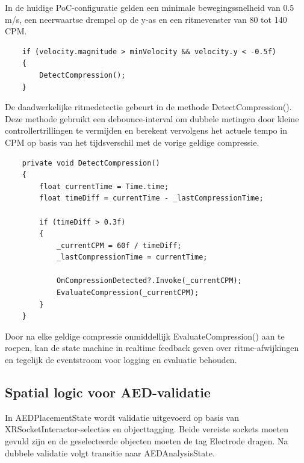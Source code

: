 In de huidige PoC-configuratie gelden een minimale bewegingssnelheid van 0.5 m/s, een neerwaartse drempel op de y-as en een ritmevenster van 80 tot 140 CPM.

\begin{listing}[ht]
    \begin{verbatim}
    if (velocity.magnitude > minVelocity && velocity.y < -0.5f)
    {
        DetectCompression();
    }
    \end{verbatim}
\caption{Kernlogica voor detectie van compressiebewegingen in CPRInteractor.}
\label{listing:cpr_interactor}
\end{listing}

De daadwerkelijke ritmedetectie gebeurt in de methode DetectCompression(). Deze methode gebruikt een debounce-interval om dubbele metingen door kleine controllertrillingen te vermijden en berekent vervolgens het actuele tempo in CPM op basis van het tijdsverschil met de vorige geldige compressie.

\begin{listing}[ht]
    \begin{verbatim}
    private void DetectCompression()
    {
        float currentTime = Time.time;
        float timeDiff = currentTime - _lastCompressionTime;

        if (timeDiff > 0.3f)
        {
            _currentCPM = 60f / timeDiff;
            _lastCompressionTime = currentTime;

            OnCompressionDetected?.Invoke(_currentCPM);
            EvaluateCompression(_currentCPM);
        }
    }
    \end{verbatim}
\caption{Debounce en CPM-berekening in DetectCompression().}
\label{listing:detect_compression}
\end{listing}

Door na elke geldige compressie onmiddellijk EvaluateCompression() aan te roepen, kan de state machine in realtime feedback geven over ritme-afwijkingen en tegelijk de eventstroom voor logging en evaluatie behouden.

\subsection{Spatial logic voor AED-validatie}

In AEDPlacementState wordt validatie uitgevoerd op basis van XRSocketInteractor-selecties en objecttagging. Beide vereiste sockets moeten gevuld zijn en de geselecteerde objecten moeten de tag Electrode dragen. Na dubbele validatie volgt transitie naar AEDAnalysisState.

